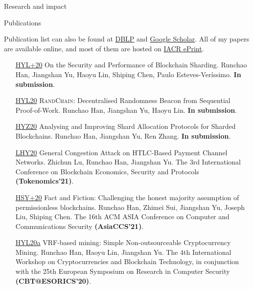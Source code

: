 \documentclass{resume} %
\begin{document}
\begin{rSection}{Research and impact}
\end{rSection}



\begin{rSection}{Publications}

    Publication list can also be found at \href{https://dblp.org/pers/hd/h/Han:Runchao}{DBLP} and \href{http://scholar.google.com/citations?user=xbpDocQAAAAJ&hl=en}{Google Scholar}.
    All of my papers are available online, and most of them are hosted on \href{https://eprint.iacr.org/}{IACR ePrint}.

    \begin{itemize}
        \item[\href{https://eprint.iacr.org/2020/1033}{HYL+20}] On the Security and Performance of Blockchain Sharding. Runchao Han, Jiangshan Yu, Haoyu Lin, Shiping Chen, Paulo Esteves-Veríssimo. \textbf{In submission}.
        \item[\href{https://eprint.iacr.org/2020/1033}{HYL20}] \textsc{RandChain}: Decentralised Randomness Beacon from Sequential Proof-of-Work. Runchao Han, Jiangshan Yu, Haoyu Lin. \textbf{In submission}.
        \item[\href{https://eprint.iacr.org/2020/943}{HYZ20}] Analysing and Improving Shard Allocation Protocols for Sharded Blockchains. Runchao Han, Jiangshan Yu, Ren Zhang. \textbf{In submission}.
        \item[\href{https://eprint.iacr.org/2020/456.pdf}{LHY20}] General Congestion Attack on HTLC-Based Payment Channel Networks. Zhichun Lu, Runchao Han, Jiangshan Yu. The 3rd International Conference on Blockchain Economics, Security and Protocols \textbf{(Tokenomics'21)}.
        \item[\href{https://eprint.iacr.org/2019/752}{HSY+20}] Fact and Fiction: Challenging the honest majority assumption of permissionless blockchains. Runchao Han, Zhimei Sui, Jiangshan Yu, Joseph Liu, Shiping Chen. The 16th ACM ASIA Conference on Computer and Communications Security \textbf{(AsiaCCS'21)}.
        \item[\href{https://github.com/DEX-ware/vrf-mining/blob/master/paper/main.pdf}{HYL20a}] VRF-based mining: Simple Non-outsourceable Cryptocurrency Mining. Runchao Han, Haoyu Lin, Jiangshan Yu. The 4th International Workshop on Cryptocurrencies and Blockchain Technology, in conjunction with the 25th European Symposium on Research in Computer Security \textbf{(CBT@ESORICS'20)}.

\end{itemize}
\end{rSection}
\end{document}
